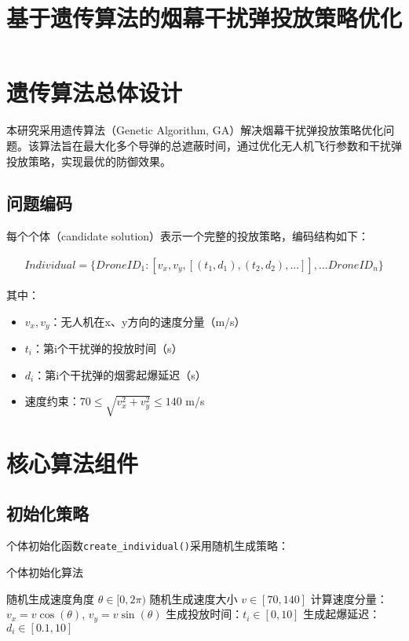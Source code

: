 \documentclass{article}
\title{基于遗传算法的烟幕干扰弹投放策略优化}
\author{}
\date{}
\begin{document}
\maketitle

\section{遗传算法总体设计}

本研究采用遗传算法（Genetic Algorithm, GA）解决烟幕干扰弹投放策略优化问题。该算法旨在最大化多个导弹的总遮蔽时间，通过优化无人机飞行参数和干扰弹投放策略，实现最优的防御效果。

\subsection{问题编码}

每个个体（candidate solution）表示一个完整的投放策略，编码结构如下：

\begin{align}
Individual = \{DroneID_1: [v_x, v_y, [(t_1, d_1), (t_2, d_2), ...]], ...DroneID_n\}
\end{align}

其中：
\begin{itemize}
    \item $v_x, v_y$：无人机在x、y方向的速度分量（m/s）
    \item $t_i$：第i个干扰弹的投放时间（s）
    \item $d_i$：第i个干扰弹的烟雾起爆延迟（s）
    \item 速度约束：$70 \leq \sqrt{v_x^2 + v_y^2} \leq 140$ m/s
\end{itemize}

\section{核心算法组件}

\subsection{初始化策略}

个体初始化函数\texttt{create\_individual()}采用随机生成策略：

\begin{algorithm}[H]
\caption{个体初始化算法}
\begin{algorithmic}[1]
    \STATE 随机生成速度角度 $\theta \in [0, 2\pi)$
    \STATE 随机生成速度大小 $v \in [70, 140]$
    \STATE 计算速度分量：$v_x = v \cos(\theta)$, $v_y = v \sin(\theta)$
        \STATE 生成投放时间：$t_i \in [0, 10]$
        \STATE 生成起爆延迟：$d_i \in [0.1, 10]$
    \ENDFOR
\ENDFOR
\end{algorithmic}
\end{algorithm}
\end{document}
